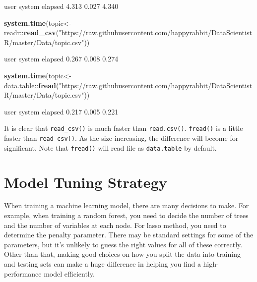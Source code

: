 \documentclass[12pt,]{krantz}
\newenvironment{Shaded}{\begin{snugshade}}{\end{snugshade}}
\newcommand{\KeywordTok}[1]{\textcolor[rgb]{0.13,0.29,0.53}{\textbf{{#1}}}}
\newcommand{\StringTok}[1]{\textcolor[rgb]{0.31,0.60,0.02}{{#1}}}
\newcommand{\NormalTok}[1]{{#1}}
\theoremstyle{definition}
\theoremstyle{definition}
\theoremstyle{remark}
\begin{document}
\begin{Shaded}
\begin{Highlighting}[]
  \NormalTok{user  system elapsed }
  \NormalTok{4.313   0.027   4.340}
\end{Highlighting}
\end{Shaded}

\begin{Shaded}
\begin{Highlighting}[]
\KeywordTok{system.time}\NormalTok{(topic<-readr::}\KeywordTok{read_csv}\NormalTok{(}\StringTok{"https://raw.githubusercontent.com/happyrabbit/DataScientistR/master/Data/topic.csv"}\NormalTok{))}
\end{Highlighting}
\end{Shaded}

\begin{Shaded}
\begin{Highlighting}[]
   \NormalTok{user  system elapsed }
  \NormalTok{0.267   0.008   0.274 }
\end{Highlighting}
\end{Shaded}

\begin{Shaded}
\begin{Highlighting}[]
\KeywordTok{system.time}\NormalTok{(topic<-data.table::}\KeywordTok{fread}\NormalTok{(}\StringTok{"https://raw.githubusercontent.com/happyrabbit/DataScientistR/master/Data/topic.csv"}\NormalTok{))}
\end{Highlighting}
\end{Shaded}

\begin{Shaded}
\begin{Highlighting}[]
   \NormalTok{user  system elapsed }
  \NormalTok{0.217   0.005   0.221 }
\end{Highlighting}
\end{Shaded}

It is clear that \texttt{read\_csv()} is much faster than
\texttt{read.csv()}. \texttt{fread()} is a little faster than
\texttt{read\_csv()}. As the size increasing, the difference will become
for significant. Note that \texttt{fread()} will read file as
\texttt{data.table} by default.

\chapter{Model Tuning Strategy}\label{model-tuning-strategy}

When training a machine learning model, there are many decisions to
make. For example, when training a random forest, you need to decide the
number of trees and the number of variables at each node. For lasso
method, you need to determine the penalty parameter. There may be
standard settings for some of the parameters, but it's unlikely to guess
the right values for all of these correctly. Other than that, making
good choices on how you split the data into training and testing sets
can make a huge difference in helping you find a high-performance model
efficiently.
\end{document}
